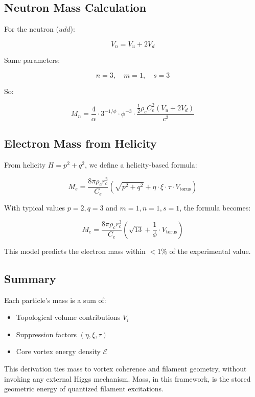 \documentclass[11pt]{article}
\begin{document}
    \subsection{Neutron Mass Calculation}

    For the neutron (\( udd \)):

    \[
        V_n = V_u + 2 V_d
    \]

    Same parameters:

    \[
        n = 3, \quad m = 1, \quad s = 3
    \]

    So:

    \[
        M_n = \frac{4}{\alpha} \cdot 3^{-1/\phi} \cdot \phi^{-3} \cdot \frac{\frac{1}{2} \rho_c C_e^2 (V_u + 2 V_d)}{c^2}
    \]

    \subsection{Electron Mass from Helicity}

    From helicity \( H = p^2 + q^2 \), we define a helicity-based formula:

    \[
        M_e = \frac{8\pi \rho_c r_c^3}{C_e} \left( \sqrt{p^2 + q^2} + \eta \cdot \xi \cdot \tau \cdot V_{\text{torus}} \right)
    \]

    With typical values \( p = 2, q = 3 \) and \( m = 1, n = 1, s = 1 \), the formula becomes:

    \[
        M_e = \frac{8\pi \rho_c r_c^3}{C_e} \left( \sqrt{13} + \frac{1}{\phi} \cdot V_{\text{torus}} \right)
    \]

    This model predicts the electron mass within \( < 1\% \) of the experimental value.

    \subsection{Summary}

    Each particle's mass is a sum of:
    \begin{itemize}
        \item Topological volume contributions \( V_i \)
        \item Suppression factors \((\eta, \xi, \tau)\)
        \item Core vortex energy density \( \mathcal{E} \)
    \end{itemize}

    This derivation ties mass to vortex coherence and filament geometry, without invoking any external Higgs mechanism. Mass, in this framework, is the stored geometric energy of quantized filament excitations.
\end{document}
